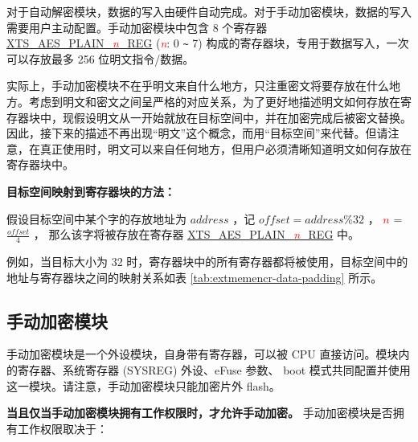 \documentclass[main\_\_CN.tex]{subfiles}
\begin{document}
对于自动解密模块，数据的写入由硬件自动完成。对于手动加密模块，数据的写入需要用户主动配置。手动加密模块中包含 8 个寄存器 \hyperref[regdesc:XTSAESPLAINNREG]{XTS\_AES\_PLAIN\_\textcolor{red}{\it{n}}\_REG} (\textcolor{red}{\it{n}}: 0 \verb+~+ 7) 构成的寄存器块，专用于数据写入，一次可以存放最多 256 位明文指令/数据。

实际上，手动加密模块不在乎明文来自什么地方，只注重密文将要存放在什么地方。考虑到明文和密文之间呈严格的对应关系，为了更好地描述明文如何存放在寄存器块中，现假设明文从一开始就放在目标空间中，并在加密完成后被密文替换。因此，接下来的描述不再出现“明文”这个概念，而用“目标空间”来代替。但请注意，在真正使用时，明文可以来自任何地方，但用户必须清晰知道明文如何存放在寄存器块中。

{\bfseries 目标空间映射到寄存器块的方法：}

假设目标空间中某个字的存放地址为 \begin{math} address \end{math} ，记  \begin{math} offset = address \% 32 \end{math} ，
    \textcolor{red}{\it{$n$}} =  \begin{math} \frac{offset}{4} \end{math} ， 那么该字将被存放在寄存器 \hyperref[regdesc:XTSAESPLAINNREG]{XTS\_AES\_PLAIN\_\textcolor{red}{\it{n}}\_REG} 中。

例如，当目标大小为 32 时，寄存器块中的所有寄存器都将被使用，目标空间中的地址与寄存器块之间的映射关系如表 \ref{tab:extmemencr-data-padding} 所示。



\subsection{手动加密模块}

手动加密模块是一个外设模块，自身带有寄存器，可以被 CPU 直接访问。模块内的寄存器、系统寄存器 (SYSREG) 外设、eFuse 参数、 boot 模式共同配置并使用这一模块。请注意，手动加密模块只能加密片外 flash。

\textbf{ 当且仅当手动加密模块拥有工作权限时，才允许手动加密。}  手动加密模块是否拥有工作权限取决于：
\end{document}
